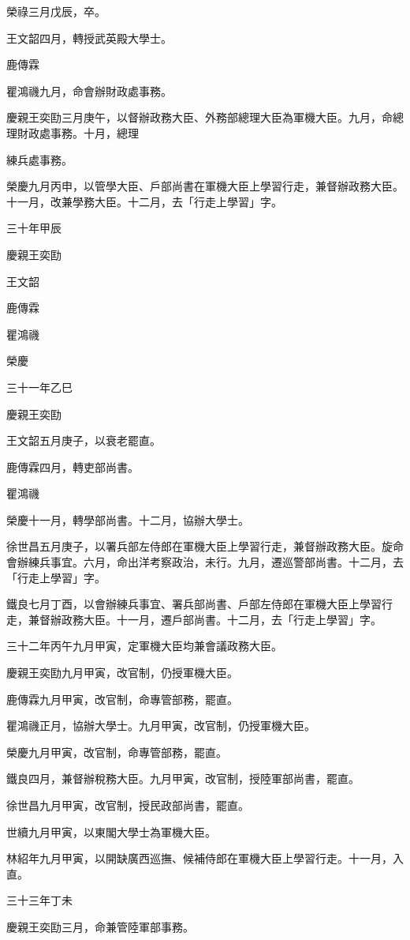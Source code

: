 \begin{pinyinscope}
榮祿三月戊辰，卒。

王文韶四月，轉授武英殿大學士。

鹿傳霖

瞿鴻禨九月，命會辦財政處事務。

慶親王奕劻三月庚午，以督辦政務大臣、外務部總理大臣為軍機大臣。九月，命總理財政處事務。十月，總理

練兵處事務。

榮慶九月丙申，以管學大臣、戶部尚書在軍機大臣上學習行走，兼督辦政務大臣。十一月，改兼學務大臣。十二月，去「行走上學習」字。

三十年甲辰

慶親王奕劻

王文韶

鹿傳霖

瞿鴻禨

榮慶

三十一年乙巳

慶親王奕劻

王文韶五月庚子，以衰老罷直。

鹿傳霖四月，轉吏部尚書。

瞿鴻禨

榮慶十一月，轉學部尚書。十二月，協辦大學士。

徐世昌五月庚子，以署兵部左侍郎在軍機大臣上學習行走，兼督辦政務大臣。旋命會辦練兵事宜。六月，命出洋考察政治，未行。九月，遷巡警部尚書。十二月，去「行走上學習」字。

鐵良七月丁酉，以會辦練兵事宜、署兵部尚書、戶部左侍郎在軍機大臣上學習行走，兼督辦政務大臣。十一月，遷戶部尚書。十二月，去「行走上學習」字。

三十二年丙午九月甲寅，定軍機大臣均兼會議政務大臣。

慶親王奕劻九月甲寅，改官制，仍授軍機大臣。

鹿傳霖九月甲寅，改官制，命專管部務，罷直。

瞿鴻禨正月，協辦大學士。九月甲寅，改官制，仍授軍機大臣。

榮慶九月甲寅，改官制，命專管部務，罷直。

鐵良四月，兼督辦稅務大臣。九月甲寅，改官制，授陸軍部尚書，罷直。

徐世昌九月甲寅，改官制，授民政部尚書，罷直。

世續九月甲寅，以東閣大學士為軍機大臣。

林紹年九月甲寅，以開缺廣西巡撫、候補侍郎在軍機大臣上學習行走。十一月，入直。

三十三年丁未

慶親王奕劻三月，命兼管陸軍部事務。


\end{pinyinscope}
